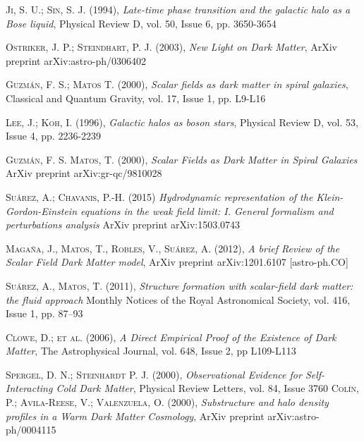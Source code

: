 \documentclass[a4paper,openright,10pt, oneside, final]{book}
\begin{document}
\begin{thebibliography}{a}
 \textsc{Ji, S. U.; Sin, S. J. (1994)},
\textit{Late-time phase transition and the galactic halo as a Bose liquid},
Physical Review D, vol. 50, Issue 6, pp. 3650-3654 

 \textsc{Ostriker, J. P.; Steindhart, P. J. (2003)},
\textit{New Light on Dark Matter},
ArXiv preprint arXiv:astro-ph/0306402

 \textsc{Guzmán, F. S.; Matos T. (2000)}, 
\textit{Scalar fields as dark matter in spiral galaxies},
Classical and Quantum Gravity, vol. 17, Issue 1, pp. L9-L16 


 \textsc{Lee, J.; Koh, I. (1996)},
\textit{Galactic halos as boson stars},
Physical Review D, vol. 53, Issue 4, pp. 2236-2239

 \textsc{Guzmán, F. S. Matos, T. (2000)},
\textit{Scalar Fields as Dark Matter in Spiral Galaxies}
ArXiv preprint arXiv:gr-qc/9810028

 \textsc{Suárez, A.; Chavanis, P.-H. (2015)}
\textit{Hydrodynamic representation of the Klein-Gordon-Einstein equations
in the weak field limit: I. General formalism and perturbations analysis}
ArXiv preprint arXiv:1503.0743

 \textsc{Magaña, J., Matos, T., Robles, V., Suárez, A. (2012)},
\textit{A brief Review of the Scalar Field Dark Matter model},
ArXiv preprint arXiv:1201.6107 [astro-ph.CO]

 \textsc{Suárez, A., Matos, T. (2011)},
\textit{Structure formation with scalar-field dark matter: the fluid approach}
Monthly Notices of the Royal Astronomical Society, vol. 416, Issue 1, pp. 87–93


 \textsc{Clowe, D.; et al. (2006)},
\textit{A Direct Empirical Proof of the Existence of Dark Matter},
The Astrophysical Journal, vol. 648, Issue 2, pp L109-L113

 \textsc{Spergel, D. N.; Steinhardt P. J. (2000)},
\textit{Observational Evidence for Self-Interacting Cold Dark Matter},
Physical Review Letters, vol. 84, Issue 3760
 \textsc{Colín, P.; Avila-Reese, V.; Valenzuela, O. (2000)},
\textit{Substructure and halo density profiles in a Warm Dark Matter Cosmology},
ArXiv preprint arXiv:astro-ph/0004115


\end{thebibliography}
\end{document}
